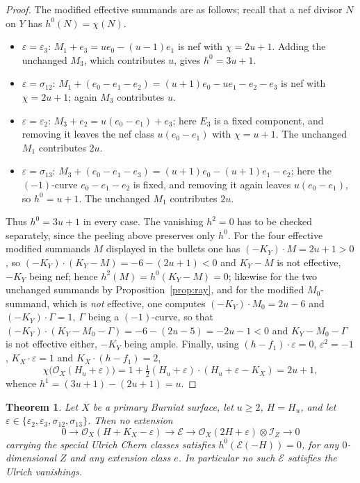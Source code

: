 \documentclass{amsart}
\newtheorem{theorem}{Theorem}[section]
\theoremstyle{definition}
\newcommand{\OO}{\mathcal{O}}
\newcommand{\EE}{\mathcal{E}}
\newcommand{\II}{\mathcal{I}}
\begin{document}
\begin{proof}
The modified effective summands are as follows; recall that a nef divisor $N$ on $Y$ has $h^0(N)=\chi(N)$.
\begin{itemize}[leftmargin=1.4em]
\item $\varepsilon=\varepsilon_3$: $M_1+e_3=ue_0-(u-1)e_1$ is nef with $\chi=2u+1$. Adding the unchanged $M_3$, which contributes $u$, gives $h^0=3u+1$.
\item $\varepsilon=\sigma_{12}$: $M_1+(e_0-e_1-e_2)=(u+1)e_0-ue_1-e_2-e_3$ is nef with $\chi=2u+1$; again $M_3$ contributes $u$.
\item $\varepsilon=\varepsilon_2$: $M_3+e_2=u(e_0-e_1)+e_3$; here $E_3$ is a fixed component, and removing it leaves the nef class $u(e_0-e_1)$ with $\chi=u+1$. The unchanged $M_1$ contributes $2u$.
\item $\varepsilon=\sigma_{13}$: $M_3+(e_0-e_1-e_3)=(u+1)e_0-(u+1)e_1-e_2$; here the $(-1)$-curve $e_0-e_1-e_2$ is fixed, and removing it again leaves $u(e_0-e_1)$, so $h^0=u+1$. The unchanged $M_1$ contributes $2u$.
\end{itemize}
Thus $h^0=3u+1$ in every case. The vanishing $h^2=0$ has to be checked separately, since the peeling above preserves only $h^0$. For the four effective modified summands $M$ displayed in the bullets one has $(-K_Y)\cdot M=2u+1>0$, so $(-K_Y)\cdot(K_Y-M)=-6-(2u+1)<0$ and $K_Y-M$ is not effective, $-K_Y$ being nef; hence $h^2(M)=h^0(K_Y-M)=0$; likewise for the two unchanged summands by Proposition~\ref{prop:ray}, and for the modified $M_0$-summand, which is \emph{not} effective, one computes $(-K_Y)\cdot M_0=2u-6$ and $(-K_Y)\cdot\Gamma=1$, $\Gamma$ being a $(-1)$-curve, so that $(-K_Y)\cdot(K_Y-M_0-\Gamma)=-6-(2u-5)=-2u-1<0$ and $K_Y-M_0-\Gamma$ is not effective either, $-K_Y$ being ample. Finally, using $(h-f_1)\cdot\varepsilon=0$, $\varepsilon^2=-1$, $K_X\cdot\varepsilon=1$ and $K_X\cdot(h-f_1)=2$,
\[
\chi\bigl(\OO_X(H_u+\varepsilon)\bigr)=1+\tfrac12(H_u+\varepsilon)\cdot(H_u+\varepsilon-K_X)=2u+1 ,
\]
whence $h^1=(3u+1)-(2u+1)=u$.
\end{proof}

\begin{theorem}\label{thm:twistedfail}
Let $X$ be a primary Burniat surface, let $u\ge2$, $H=H_u$, and let $\varepsilon\in\{\varepsilon_2,\varepsilon_3,\sigma_{12},\sigma_{13}\}$. Then no extension
\[
0\longrightarrow\OO_X(H+K_X-\varepsilon)\longrightarrow\EE\longrightarrow\OO_X(2H+\varepsilon)\otimes\II_Z\longrightarrow0
\]
carrying the special Ulrich Chern classes satisfies $h^0(\EE(-H))=0$, for any $0$-dimensional $Z$ and any extension class $e$. In particular no such $\EE$ satisfies the Ulrich vanishings.
\end{theorem}
\end{document}
